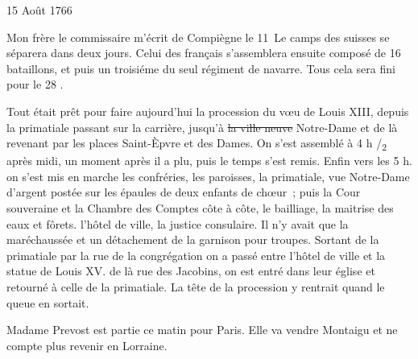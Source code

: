                      \begin{diary}{15 Août 1766}{}
                        
                        
                           Mon frère le commissaire m'écrit de Compiègne
                           le 11 \og Le camps des suisses se
                              séparera dans
                              deux jours. Celui des français s'assemblera
                              ensuite composé de 16 bataillons, et puis un troisiéme du seul
                                 régiment de navarre. Tous
                              cela sera fini pour le 28 \fg{}. \bigskip
        
        
                         Tout était prêt pour
                           faire aujourd'hui la
                           procession du vœu de Louis XIII, depuis la
                              primatiale
                           passant sur la
                              carrière, jusqu'à \sout{la ville neuve}
                           Notre-Dame et de là revenant par les places Saint-Èpvre et des
                              Dames. On s'est assemblé
                           à 4 h /\textsubscript{2}
                           après midi, un moment après il a
                           plu, puis le temps s'est remis. Enfin vers les
                           5 h. on s'est mis en marche les confréries,
                           les paroisses, la primatiale, vue Notre-Dame
                           d'argent postée sur les épaules de deux enfants
                           de chœur ; puis la Cour
                              souveraine et
                           la Chambre des Comptes
                           côte à côte, le bailliage,
                           la maitrise des eaux et fôrets. l'hôtel de
                           ville,
                           la justice consulaire. Il n'y avait que
                           la maréchaussée et un détachement de
                           la garnison pour troupes. Sortant de
                           la primatiale par
                              la rue de la congrégation
                           on a passé entre l'hôtel de ville et la statue
                           de Louis XV. de là rue des Jacobins, on est
                           entré dans leur église et retourné à
                           celle de la
                           primatiale. La tête de la
                           procession y rentrait quand le queue
                           en sortait. \bigskip
        
        
                        
                           Madame Prevost est partie ce matin pour
                           Paris. Elle va vendre Montaigu et
                           ne compte plus revenir en Lorraine. \bigskip
        
        
                     \end{diary}
                     
